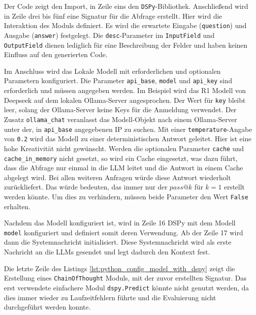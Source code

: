 Der Code zeigt den Import, in Zeile eins den \texttt{DSPy}-Bibliothek. Anschließend wird in Zeile drei bis fünf eine Signatur für die Abfrage erstellt. Hier wird die Interaktion des Moduls definiert. Es wird die erwartete Eingabe (\texttt{question}) und Ausgabe (\texttt{answer}) festgelegt. Die \texttt{desc}-Parameter im \texttt{InputField} und \texttt{OutputField} dienen lediglich für eine Beschreibung der Felder und haben keinen Einfluss auf den generierten Code.\vspace{0.2cm}

Im Anschluss wird das Lokale Modell mit erforderlichen und optionalen Parametern konfiguriert. Die Parameter \texttt{api\_base}, \texttt{model} und \texttt{api\_key} sind erforderlich und müssen angegeben werden. Im Beispiel wird das R1 Modell von Deepseek auf dem lokalen Ollama-Server angesprochen. Der Wert für \texttt{key} bleibt leer, solang der Ollama-Server keine Keys für die Anmeldung verwendet. Der Zusatz \texttt{ollama\_chat} veranlasst das Modell-Objekt nach einem Ollama-Server unter der, in \texttt{api\_base} angegebenen IP zu suchen. Mit einer \texttt{temperature}-Angabe von \texttt{0.2} wird das Modell zu einer deterministischen Antwort geleitet. Hier ist eine hohe Kreativität nicht gewünscht. Werden die optionalen Parameter \texttt{cache} und \texttt{cache\_in\_memory} nicht gesetzt, so wird ein Cache eingesetzt, was dazu führt, dass die Abfrage nur einmal in die LLM leitet und die Antwort in einem Cache abgelegt wird. Bei allen weiteren Anfragen würde diese Antwort wiederholt zurückliefert. Das würde bedeuten, das immer nur der $pass@k$ für $k=1$ erstellt werden könnte. Um dies zu verhindern, müssen beide Parameter den Wert \texttt{False} erhalten.\vspace{0.2cm}

Nachdem das Modell konfiguriert ist, wird in Zeile 16 DSPy mit dem Modell \texttt{model} konfiguriert und definiert somit deren Verwendung. Ab der Zeile 17 wird dann die Systemnachricht initialisiert. Diese Systemnachricht wird als erste Nachricht an die LLMs gesendet und legt dadurch den Kontext fest.\vspace{0.2cm}

Die letzte Zeile des Listings \ref{lst:python_config_model_with_dspy} zeigt die Erstellung eines \texttt{ChainOfThought} Moduls, mit der zuvor erstellten Signatur. Das erst verwendete einfachere Modul \texttt{dspy.Predict} könnte nicht genutzt werden, da dies immer wieder zu Laufzeitfehlern führte und die Evaluierung nicht durchgeführt werden konnte.


